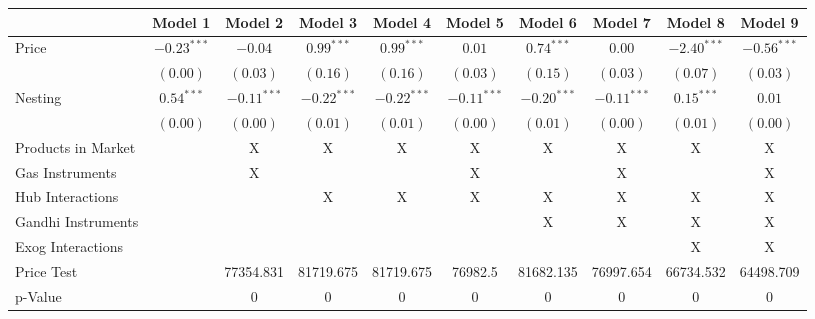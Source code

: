 
\begin{tabular}{l c c c c c c c c c}
\toprule
 & Model 1 & Model 2 & Model 3 & Model 4 & Model 5 & Model 6 & Model 7 & Model 8 & Model 9 \\
\midrule
Price                       & $-0.23^{***}$ & $-0.04$       & $0.99^{***}$  & $0.99^{***}$  & $0.01$        & $0.74^{***}$  & $0.00$        & $-2.40^{***}$ & $-0.56^{***}$ \\
                            & $(0.00)$      & $(0.03)$      & $(0.16)$      & $(0.16)$      & $(0.03)$      & $(0.15)$      & $(0.03)$      & $(0.07)$      & $(0.03)$      \\
Nesting                     & $0.54^{***}$  & $-0.11^{***}$ & $-0.22^{***}$ & $-0.22^{***}$ & $-0.11^{***}$ & $-0.20^{***}$ & $-0.11^{***}$ & $0.15^{***}$  & $0.01$        \\
                            & $(0.00)$      & $(0.00)$      & $(0.01)$      & $(0.01)$      & $(0.00)$      & $(0.01)$      & $(0.00)$      & $(0.01)$      & $(0.00)$      \\
\midrule
Products in Market          &               & X             & X             & X             & X             & X             & X             & X             & X             \\
Gas Instruments             &               & X             &               &               & X             &               & X             &               & X             \\
Hub Interactions            &               &               & X             & X             & X             & X             & X             & X             & X             \\
Gandhi Instruments          &               &               &               &               &               & X             & X             & X             & X             \\
Exog Interactions           &               &               &               &               &               &               &               & X             & X             \\
Price Test                  &               & 77354.831     & 81719.675     & 81719.675     & 76982.5       & 81682.135     & 76997.654     & 66734.532     & 64498.709     \\
p-Value                     &               & 0             & 0             & 0             & 0             & 0             & 0             & 0             & 0             \\

\end{tabular}
